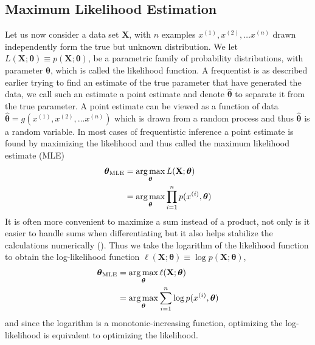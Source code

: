 \subsection{Maximum Likelihood Estimation} \label{sec:mle}
Let us now consider a data set $\mathbf{X}$, with $n$ examples $x^{(1)}, x^{(2)},\ldots x^{(n)}$ drawn independently form the true but unknown distribution. We let
$L(\mathbf{X};\boldsymbol{\theta})\equiv p(\mathbf{X};\boldsymbol{\theta})$, be a parametric family of probability distributions, with parameter $\boldsymbol{\theta}$, which is called the likelihood function. A frequentist is as described earlier trying to find an estimate of the true parameter that have generated the data, we call such an estimate a point estimate and denote $\hat{\boldsymbol{\theta}}$ to separate it from the true parameter. A point estimate can be viewed as a function of data $\hat{\boldsymbol{\theta}}=g(x^{(1)}, x^{(2)},\ldots x^{(n)})$ which is drawn from a random process and thus $\hat{\boldsymbol{\theta}}$ is a random variable.
In most cases of frequentistic inference a point estimate is found by maximizing the likelihood and thus called the maximum likelihood estimate (MLE)
\begin{equation*}
\begin{split}
        \boldsymbol{\boldsymbol{\theta}}_{\text{MLE}}&=\operatorname*{arg\,max}_{\boldsymbol{\theta}}{L(\mathbf{X};\boldsymbol{\theta})}\\
        & = \operatorname*{arg\,max}_{\boldsymbol{\theta}}{\prod^n_{i=1}p(x^{(i)},\boldsymbol{\theta})}
\end{split}
\end{equation*}
It is often more convenient to maximize a sum instead of a product, not only is it easier to handle sums when differentiating but it also helps stabilize the calculations numerically (\cite{Goodfellow-et-al-2016}). Thus we take the logarithm of the likelihood function to obtain the log-likelihood function $\ell(\mathbf{X};\boldsymbol{\theta})\equiv \log{p(\mathbf{X};\boldsymbol{\theta})}$,
\begin{equation*}
\begin{split}
        \boldsymbol{\boldsymbol{\theta}}_{\text{MLE}}&=\operatorname*{arg\,max}_{\boldsymbol{\theta}}{\ell(\mathbf{X};\boldsymbol{\theta})}\\
        &=\operatorname*{arg\,max}_{\boldsymbol{\boldsymbol{\theta}}}{\sum^n_{i=1}\log{p(x^{(i)},\boldsymbol{\theta})}}
\end{split}
\end{equation*}
and since the logarithm is a monotonic-increasing function, optimizing the log-likelihood is equivalent to optimizing the likelihood. \\
